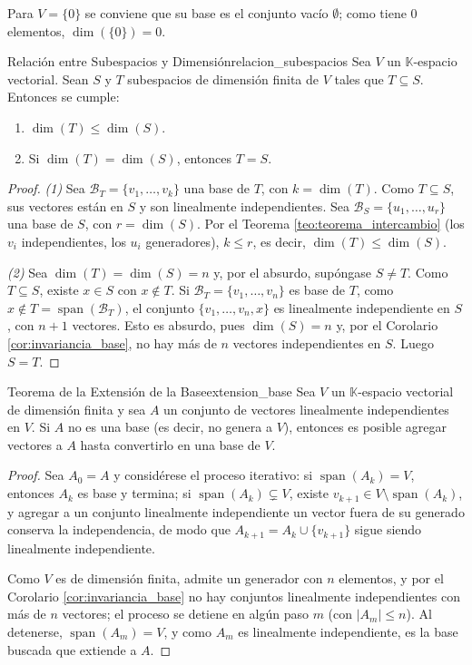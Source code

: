 \documentclass[11pt, a4paper]{article}
\begin{document}
\obs Para $V = \{0\}$ se conviene que su base es el conjunto vacío $\emptyset$; como tiene $0$ elementos, $\dim(\{0\}) = 0$.

\begin{proposicion}{Relación entre Subespacios y Dimensión}{relacion_subespacios}
Sea $V$ un $\mathbb{K}$-espacio vectorial. Sean $S$ y $T$ subespacios de dimensión finita de $V$ tales que $T \subseteq S$. Entonces se cumple:
\begin{enumerate}
    \item $\dim(T) \le \dim(S)$.
    \item Si $\dim(T) = \dim(S)$, entonces $T = S$.
\end{enumerate}
\end{proposicion}

\begin{proof}
\textit{(1)} Sea $\mathcal{B}_T = \{v_1, \dots, v_k\}$ una base de $T$, con $k = \dim(T)$. Como $T \subseteq S$, sus vectores están en $S$ y son linealmente independientes. Sea $\mathcal{B}_S = \{u_1, \dots, u_r\}$ una base de $S$, con $r = \dim(S)$. Por el Teorema \ref{teo:teorema_intercambio} (los $v_i$ independientes, los $u_i$ generadores), $k \le r$, es decir, $\dim(T) \le \dim(S)$.

\textit{(2)} Sea $\dim(T) = \dim(S) = n$ y, por el absurdo, supóngase $S \neq T$. Como $T \subseteq S$, existe $x \in S$ con $x \notin T$. Si $\mathcal{B}_T = \{v_1, \dots, v_n\}$ es base de $T$, como $x \notin T = \operatorname{span}(\mathcal{B}_T)$, el conjunto $\{v_1, \dots, v_n, x\}$ es linealmente independiente en $S$, con $n+1$ vectores. Esto es absurdo, pues $\dim(S) = n$ y, por el Corolario \ref{cor:invariancia_base}, no hay más de $n$ vectores independientes en $S$. Luego $S = T$.
\end{proof}

\begin{teorema}{Teorema de la Extensión de la Base}{extension_base}
Sea $V$ un $\mathbb{K}$-espacio vectorial de dimensión finita y sea $A$ un conjunto de vectores linealmente independientes en $V$.
Si $A$ no es una base (es decir, no genera a $V$), entonces es posible agregar vectores a $A$ hasta convertirlo en una base de $V$.
\end{teorema}

\begin{proof}
Sea $A_0 = A$ y considérese el proceso iterativo: si $\operatorname{span}(A_k) = V$, entonces $A_k$ es base y termina; si $\operatorname{span}(A_k) \subsetneq V$, existe $v_{k+1} \in V \setminus \operatorname{span}(A_k)$, y agregar a un conjunto linealmente independiente un vector fuera de su generado conserva la independencia, de modo que $A_{k+1} = A_k \cup \{v_{k+1}\}$ sigue siendo linealmente independiente.

Como $V$ es de dimensión finita, admite un generador con $n$ elementos, y por el Corolario \ref{cor:invariancia_base} no hay conjuntos linealmente independientes con más de $n$ vectores; el proceso se detiene en algún paso $m$ (con $|A_m| \le n$). Al detenerse, $\operatorname{span}(A_m) = V$, y como $A_m$ es linealmente independiente, es la base buscada que extiende a $A$.
\end{proof}
\end{document}
